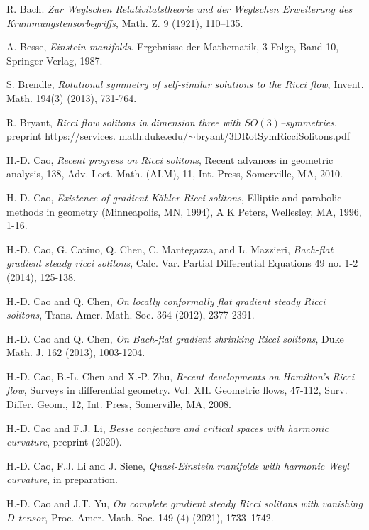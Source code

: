 \documentclass{amsart}
\theoremstyle{definition}
\theoremstyle{remark}
\numberwithin{equation}{section}
\begin{document}
	
	\begin{thebibliography}{30}
		R. Bach. {\em Zur Weylschen Relativi{t\:at}stheorie und der Weylschen Erweiterung des Krummungstensorbegriffs}, Math. Z. 9 (1921), 110--135.
		
		  A. Besse,  {\em Einstein manifolds}. Ergebnisse der Mathematik, 3 Folge, Band 10, Springer-Verlag, 1987.
		
		 S. Brendle, {\em Rotational symmetry of self-similar solutions to the Ricci flow}, Invent. Math. 194(3) (2013), 731-764.

 R. Bryant, {\em Ricci flow solitons in dimension three with $SO(3)$–symmetries}, preprint 
https://services.
math.duke.edu/$\sim$bryant/3DRotSymRicciSolitons.pdf

		 H.-D. Cao, {\em Recent progress on Ricci solitons}, Recent advances in geometric
		analysis, 138, Adv. Lect. Math. (ALM), 11, Int. Press, Somerville, MA, 2010.
		
		 H.-D. Cao, {\em Existence of gradient {K}\"ahler-{R}icci solitons},
		Elliptic and parabolic methods in geometry (Minneapolis, MN, 1994), A K Peters,
		Wellesley, MA, 1996, 1-16.
		
		 H.-D. Cao, G. Catino, Q. Chen, C. Mantegazza,
		and L. Mazzieri,  {\em Bach-flat gradient steady ricci solitons}, Calc. Var. Partial Differential Equations 49 no. 1-2 (2014), 125-138.
		
		  H.-D. Cao and Q. Chen, {\em On locally conformally flat gradient steady Ricci solitons},
		Trans. Amer. Math. Soc. 364 (2012), 2377-2391.
		
		 H.-D. Cao and Q. Chen, {\em On Bach-flat gradient shrinking Ricci solitons}, Duke
		Math. J. 162 (2013), 1003-1204.
		
		 H.-D. Cao, B.-L. Chen and X.-P. Zhu, {\em Recent developments on Hamilton's Ricci flow},   Surveys in differential geometry. Vol. XII. Geometric flows,  47-112, Surv. Differ. Geom., 12, Int. Press, Somerville, MA, 2008.

          H.-D. Cao and F.J. Li, {\em  Besse conjecture and critical spaces with harmonic curvature}, preprint (2020).

 H.-D. Cao, F.J. Li and J. Siene, {\em  Quasi-Einstein manifolds with harmonic Weyl curvature}, in preparation. 
		
		 H.-D. Cao and J.T. Yu, {\em On complete gradient steady Ricci solitons with vanishing $D$-tensor},
		Proc. Amer. Math. Soc. 149 (4) (2021), 1733–1742.
		

\end{thebibliography}
\end{document}
